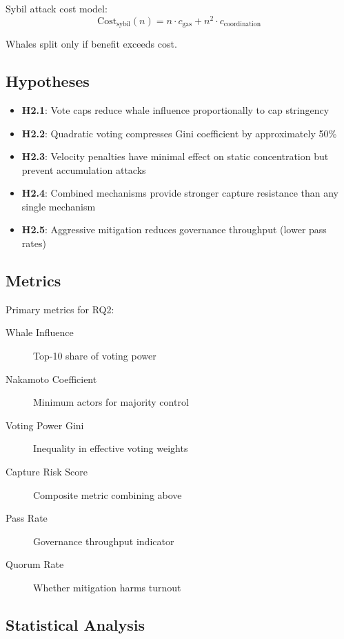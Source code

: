 Sybil attack cost model:
\begin{equation}
\text{Cost}_{\text{sybil}}(n) = n \cdot c_{\text{gas}} + n^2 \cdot c_{\text{coordination}}
\end{equation}

Whales split only if benefit exceeds cost.

\subsection{Hypotheses}

\begin{itemize}
    \item \textbf{H2.1}: Vote caps reduce whale influence proportionally to cap stringency
    \item \textbf{H2.2}: Quadratic voting compresses Gini coefficient by approximately 50\%
    \item \textbf{H2.3}: Velocity penalties have minimal effect on static concentration but prevent accumulation attacks
    \item \textbf{H2.4}: Combined mechanisms provide stronger capture resistance than any single mechanism
    \item \textbf{H2.5}: Aggressive mitigation reduces governance throughput (lower pass rates)
\end{itemize}

\subsection{Metrics}

Primary metrics for RQ2:

\begin{description}
    \item[Whale Influence] Top-10 share of voting power
    \item[Nakamoto Coefficient] Minimum actors for majority control
    \item[Voting Power Gini] Inequality in effective voting weights
    \item[Capture Risk Score] Composite metric combining above
    \item[Pass Rate] Governance throughput indicator
    \item[Quorum Rate] Whether mitigation harms turnout
\end{description}

\subsection{Statistical Analysis}

